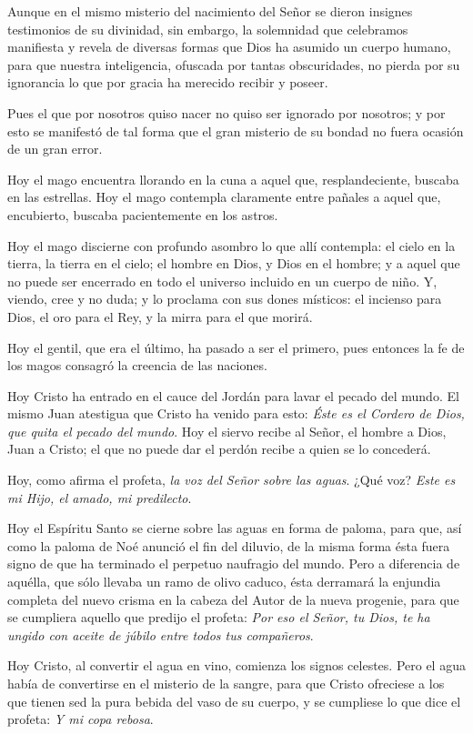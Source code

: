 			\begin{body}
				Aunque en el mismo misterio del nacimiento del Señor se dieron insignes testimonios de su divinidad, sin embargo, la solemnidad que celebramos manifiesta y revela de diversas formas que Dios ha asumido un cuerpo humano, para que nuestra inteligencia, ofuscada por tantas obscuridades, no pierda por su ignorancia lo que por gracia ha merecido recibir y poseer.
				
				Pues el que por nosotros quiso nacer no quiso ser ignorado por nosotros; y por esto se manifestó de tal forma que el gran misterio de su bondad no fuera ocasión de un gran error.
				
				Hoy el mago encuentra llorando en la cuna a aquel que, resplandeciente, buscaba en las estrellas. Hoy el mago contempla claramente entre pañales a aquel que, encubierto, buscaba pacientemente en los astros.
				
				Hoy el mago discierne con profundo asombro lo que allí contempla: el cielo en la tierra, la tierra en el cielo; el hombre en Dios, y Dios en el hombre; y a aquel que no puede ser encerrado en todo el universo incluido en un cuerpo de niño. Y, viendo, cree y no duda; y lo proclama con sus dones místicos: el incienso para Dios, el oro para el Rey, y la mirra para el que morirá.
				
				Hoy el gentil, que era el último, ha pasado a ser el primero, pues entonces la fe de los magos consagró la creencia de las naciones.
				
				Hoy Cristo ha entrado en el cauce del Jordán para lavar el pecado del mundo. El mismo Juan atestigua que Cristo ha venido para esto: \emph{Éste es el Cordero de Dios, que quita el pecado del mundo}. Hoy el siervo recibe al Señor, el hombre a Dios, Juan a Cristo; el que no puede dar el perdón recibe a quien se lo concederá.
				
				Hoy, como afirma el profeta, \emph{la voz del Señor sobre las aguas}. ¿Qué voz? \emph{Este es mi Hijo, el amado, mi predilecto}.
				
				Hoy el Espíritu Santo se cierne sobre las aguas en forma de paloma, para que, así como la paloma de Noé anunció el fin del diluvio, de la misma forma ésta fuera signo de que ha terminado el perpetuo naufragio del mundo. Pero a diferencia de aquélla, que sólo llevaba un ramo de olivo caduco, ésta derramará la enjundia completa del nuevo crisma en la cabeza del Autor de la nueva progenie, para que se cumpliera aquello que predijo el profeta: \emph{Por eso el Señor, tu Dios, te ha ungido con aceite de júbilo entre todos tus compañeros}.
				
				Hoy Cristo, al convertir el agua en vino, comienza los signos celestes. Pero el agua había de convertirse en el misterio de la sangre, para que Cristo ofreciese a los que tienen sed la pura bebida del vaso de su cuerpo, y se cumpliese lo que dice el profeta: \emph{Y mi copa rebosa}.
			\end{body}
		
